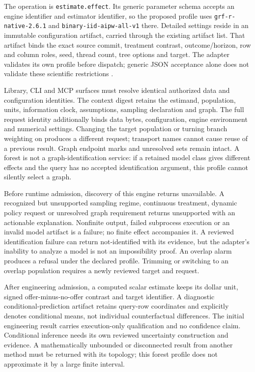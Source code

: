 The operation is \texttt{estimate.effect}. Its generic parameter schema
accepts an engine identifier and estimator identifier, so the proposed
profile uses \texttt{grf-r-native-2.6.1} and
\texttt{binary-iid-aipw-all-v1} there. Detailed settings reside in an
immutable configuration artifact, carried through the existing artifact
list. That artifact binds the exact source commit, treatment contrast,
outcome/horizon, row and column roles, seed, thread count, tree options
and target. The adapter validates its own profile before dispatch;
generic JSON acceptance alone does not validate these scientific
restrictions \cite{exec13_grf_design}.

Library, CLI and MCP surfaces must resolve identical authorized data and
configuration identities. The context digest retains the estimand,
population, units, information clock, assumptions, sampling declaration
and graph. The full request identity additionally binds data bytes,
configuration, engine environment and numerical settings. Changing the
target population or turning branch weighting on produces a different
request; transport names cannot cause reuse of a previous result. Graph
endpoint marks and unresolved sets remain intact. A forest is not a
graph-identification service: if a retained model class gives different
effects and the query has no accepted identification argument, this
profile cannot silently select a graph.

Before runtime admission, discovery of this engine returns unavailable.
A recognized but unsupported sampling regime, continuous treatment,
dynamic policy request or unresolved graph requirement returns
unsupported with an actionable explanation. Nonfinite output, failed
subprocess execution or an invalid model artifact is a failure; no
finite effect accompanies it. A reviewed identification failure can
return not-identified with its evidence, but the adapter's inability to
analyze a model is not an impossibility proof. An overlap alarm produces
a refusal under the declared profile. Trimming or switching to an
overlap population requires a newly reviewed target and request.

After engineering admission, a computed scalar estimate keeps its dollar
unit, signed offer-minus-no-offer contrast and target identifier. A
diagnostic conditional-prediction artifact retains query-row coordinates
and explicitly denotes conditional means, not individual counterfactual
differences. The initial engineering result carries execution-only
qualification and no confidence claim. Conditional inference needs its
own reviewed uncertainty construction and evidence. A mathematically
unbounded or disconnected result from another method must be returned
with its topology; this forest profile does not approximate it by a
large finite interval.

